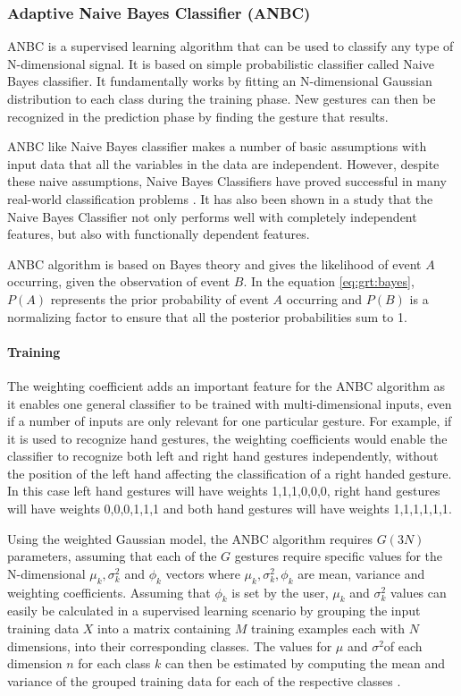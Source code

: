 \subsubsection{Adaptive Naive Bayes Classifier (ANBC)} \label{sec:anbc} ANBC \cite{14} is a supervised learning algorithm that can be used to classify any type of N-dimensional signal. It is based on simple probabilistic classifier called Naive Bayes classifier. It fundamentally works by fitting an N-dimensional Gaussian distribution to each class during the training phase. New gestures can then be recognized in the prediction phase by finding the gesture that results.

ANBC like Naive Bayes classifier makes a number of basic assumptions with input data that all the variables in the data are independent. However, despite these naive assumptions, Naive Bayes Classifiers have proved successful in many real-world classification problems \cite{15}. It has also been shown in a study that the Naive Bayes Classifier not only performs well with completely independent features, but also with functionally dependent features.

ANBC algorithm is based on Bayes theory and gives the likelihood of event $A$ occurring, given the observation of event $B$. In the equation \ref{eq:grt:bayes}, $P(A)$ represents the prior probability of event $A$ occurring and $P(B)$ is a normalizing factor to ensure that all the posterior probabilities sum to 1.



\paragraph*{Training} The weighting coefficient adds an important feature for the ANBC algorithm as it enables one general classifier to be trained with multi-dimensional inputs, even if a number of inputs are only relevant for one particular gesture. For example, if it is used to recognize hand gestures, the weighting coefficients would enable the classifier to recognize both left and right hand gestures independently, without the position of the left hand affecting the classification of a right handed gesture. In this case left hand gestures will have weights {1,1,1,0,0,0}, right hand gestures will have weights {0,0,0,1,1,1} and both hand gestures will have weights {1,1,1,1,1,1}.

Using the weighted Gaussian model, the ANBC algorithm requires $G(3N)$ parameters, assuming that each of the $G$ gestures require specific values for the N-dimensional $ \mu_{k} , \sigma_{k}^{2} $ and $ \phi_{k} $ vectors where $ \mu_{k} , \sigma_{k}^{2},\phi_{k}$ are mean, variance and weighting coefficients. Assuming that $ \phi_{k} $ is set by the user, $ \mu_{k} $ and $\sigma_{k}^{2} $ values can easily be calculated in a supervised learning scenario by grouping the input training data $X$ into a matrix containing $M$ training examples each with $N$ dimensions, into their corresponding classes. The values for $ \mu$ and $\sigma^{2} $of each dimension $n$ for each class $k$ can then be estimated by computing the mean and variance of the grouped training data for each of the respective classes \cite{14}.

